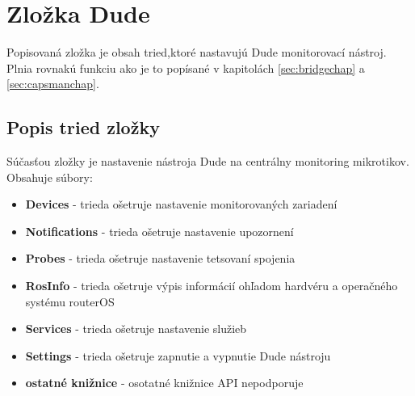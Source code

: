 \section{Zložka Dude}
Popisovaná zložka je obsah tried,ktoré nastavujú Dude monitorovací nástroj. Plnia rovnakú funkciu ako je to popísané v kapitolách \ref{sec:bridgechap} a \ref{sec:capsmanchap}. 
\subsection{Popis tried zložky}
Súčasťou zložky je nastavenie nástroja Dude na centrálny monitoring mikrotikov. Obsahuje súbory:\begin{itemize}
\item \textbf{Devices} - trieda ošetruje nastavenie monitorovaných zariadení
\item \textbf{Notifications} - trieda ošetruje nastavenie upozornení
\item \textbf{Probes} - trieda ošetruje nastavenie tetsovaní spojenia
\item \textbf{RosInfo} - trieda ošetruje výpis informácií ohľadom hardvéru a operačného systému routerOS
\item \textbf{Services} - trieda ošetruje nastavenie služieb
\item \textbf{Settings} - trieda ošetruje zapnutie a vypnutie Dude nástroju
\item \textbf{ostatné knižnice} - osotatné knižnice API nepodporuje
\end{itemize}
